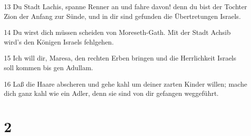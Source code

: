 \par 13 Du Stadt Lachis, spanne Renner an und fahre davon! denn du bist der Tochter Zion der Anfang zur Sünde, und in dir sind gefunden die Übertretungen Israels.
\par 14 Du wirst dich müssen scheiden von Moreseth-Gath. Mit der Stadt Achsib wird's den Königen Israels fehlgehen.
\par 15 Ich will dir, Maresa, den rechten Erben bringen und die Herrlichkeit Israels soll kommen bis gen Adullam.
\par 16 Laß die Haare abscheren und gehe kahl um deiner zarten Kinder willen; mache dich ganz kahl wie ein Adler, denn sie sind von dir gefangen weggeführt.

\chapter{2}

